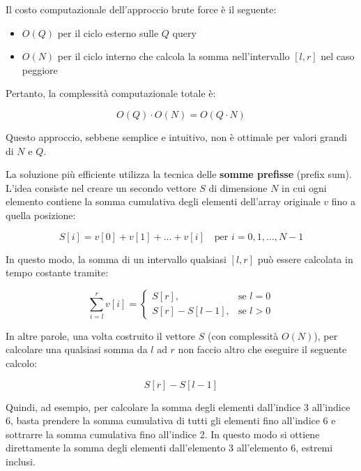 Il costo computazionale dell'approccio brute force è il seguente:
\begin{itemize}
	\item $O(Q)$ per il ciclo esterno sulle $Q$ query
	\item $O(N)$ per il ciclo interno che calcola la somma nell'intervallo $[l, r]$ nel caso peggiore
\end{itemize}

Pertanto, la complessità computazionale totale è:

\begin{equation*}
	O(Q) \cdot O(N) = O(Q \cdot N)
\end{equation*}

Questo approccio, sebbene semplice e intuitivo, non è ottimale per valori grandi di $N$ e $Q$. 

\medskip
\noindent La soluzione più efficiente utilizza la tecnica delle \textbf{somme prefisse} (prefix sum).  
L'idea consiste nel creare un secondo vettore $S$ di dimensione $N$ in cui ogni elemento contiene la somma cumulativa degli elementi dell'array originale $v$ fino a quella posizione:

\begin{equation*}
	S[i] = v[0] + v[1] + \dots + v[i] \quad \text{per } i = 0, 1, \dots, N-1
\end{equation*}

In questo modo, la somma di un intervallo qualsiasi $[l, r]$ può essere calcolata in tempo costante tramite:

\begin{equation*}
	\sum_{i=l}^{r} v[i] =
	\begin{cases}
		S[r], & \text{se } l = 0 \\
		S[r] - S[l-1], & \text{se } l > 0
	\end{cases}
\end{equation*}

In altre parole, una volta costruito il vettore $S$ (con complessità $O(N)$), per calcolare una qualsiasi somma da $l$ ad $r$ non faccio altro che eseguire il seguente calcolo:

\begin{equation}
	S[r] - S[l-1]
\end{equation}

Quindi, ad esempio, per calcolare la somma degli elementi dall'indice 3 all'indice 6, basta prendere la somma cumulativa di tutti gli elementi fino all'indice 6 e sottrarre la somma cumulativa fino all'indice 2. In questo modo si ottiene direttamente la somma degli elementi dall'elemento 3 all'elemento 6, estremi inclusi.

